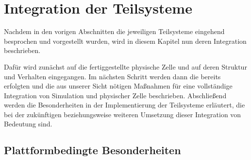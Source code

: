 \section{Integration der Teilsysteme}
Nachdem in den vorigen Abschnitten die jeweiligen Teilsysteme eingehend besprochen und vorgestellt wurden, wird in diesem Kapitel nun deren Integration beschrieben.

Dafür wird zunächst auf die fertiggestellte physische Zelle und auf deren Struktur und Verhalten eingegangen. Im nächsten Schritt werden dann die bereits erfolgten und die aus unserer Sicht nötigen Maßnahmen für eine vollständige Integration von Simulation und physischer Zelle beschrieben. Abschließend werden die Besonderheiten in der Implementierung der Teilsysteme erläutert, die bei der zukünftigen beziehungsweise weiteren Umsetzung dieser Integration von Bedeutung sind.
 



\subsection{Plattformbedingte Besonderheiten}


